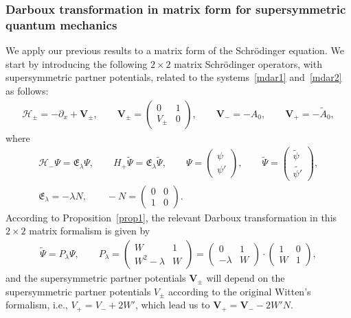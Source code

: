 \documentclass[10pt,a4paper]{amsart}
\numberwithin{equation}{section}
\begin{document}
\subsubsection[Darboux transformation in matrix form for supersymmetric quantum mechanics]
{Darboux transformation in matrix form for supersymmetric \\quantum mechanics}
We apply our previous results to a {matrix form} of the Schr\"odinger equation. We start by introducing the following $2\times 2$ matrix Schr\"odinger operators, with supersymmetric partner potentials, related to the systems~\eqref{mdar1} and~\eqref{mdar2} as follows:
\begin{gather*}
\mathcal H_\pm=-\partial_x+\mathbf{V}_\pm,\qquad
\mathbf{V}_{\pm} =\begin{pmatrix}0&1\\V_{\pm}&0\end{pmatrix}\!,\qquad
\mathbf{V}_{-}=-A_0,\qquad
\mathbf{V}_{+}=-\widetilde{A}_0,
\end{gather*}
where
\begin{gather*}
\mathcal H_-\Psi=\mathfrak{E}_{\lambda} \Psi,\qquad
H_+\widetilde{\Psi}=\mathfrak{E}_{\lambda} \widetilde{\Psi}, \qquad
\Psi=\begin{pmatrix} \psi\\ \psi'\end{pmatrix}\!,\qquad
\widetilde{\Psi}=\begin{pmatrix} \widetilde{\psi}\\ \widetilde{\psi'}\end{pmatrix}\!,\\ \mathfrak{E}_{\lambda}=-\lambda N,\qquad
-N=\begin{pmatrix}0&0\\1&0\end{pmatrix}\!.
\end{gather*}
According to Proposition~\ref{prop1}, the relevant Darboux transformation in this $2\times 2$ matrix formalism is given by
\begin{gather*}
\widetilde{\Psi}=P_\lambda\Psi,	\qquad
P_\lambda=\begin{pmatrix}W&1\\W^2-\lambda&W \end{pmatrix}=
\begin{pmatrix} 0 & 1 \\ -\lambda&W\end{pmatrix}\cdot \begin{pmatrix} 1&0\\W&1\end{pmatrix}\!,
\end{gather*}
and the supersymmetric partner potentials $\mathbf{V}_\pm$ will depend on the supersymmetric partner potentials $V_\pm$ according to the original Witten's formalism, i.e., $V_+=V_-+2W'$, which lead us to $\mathbf{V}_+=\mathbf{V}_--2W'N$.
\end{document}
